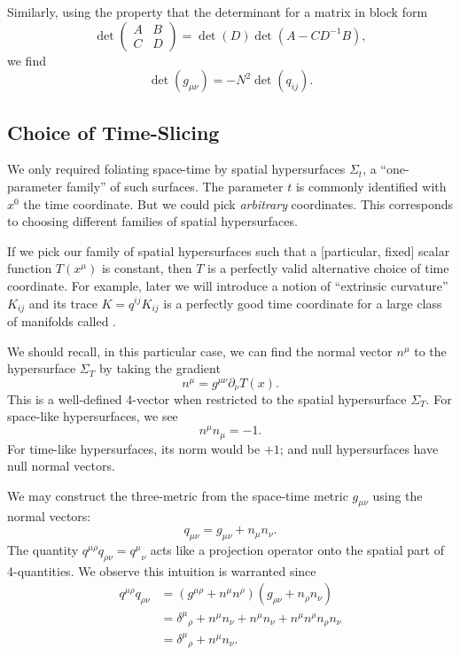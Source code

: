 Similarly, using the property that the determinant for a matrix in block
form
\begin{equation}
\det\begin{pmatrix}A & B\\ C & D
\end{pmatrix} = \det(D)\det(A - CD^{-1}B),
\end{equation}
we find
\begin{equation}\label{eq:cauchy-surface:determinant-of-metric}
\det(g_{\mu\nu}) = -N^{2}\det(q_{ij}).
\end{equation}

\subsection{Choice of Time-Slicing}

We only required foliating space-time by spatial hypersurfaces
$\Sigma_{t}$, a ``one-parameter family'' of such surfaces. The parameter
$t$ is commonly identified with $x^{0}$ the time coordinate. But we
could pick \emph{arbitrary} coordinates. This corresponds to choosing
different families of spatial hypersurfaces.

If we pick our family of spatial hypersurfaces such that a [particular,
fixed] scalar function $T(x^{\mu})$ is constant, then $T$ is a perfectly
valid alternative choice of time coordinate. For example, later we will
introduce a notion of ``extrinsic curvature'' $K_{ij}$ and its trace
$K=q^{ij}K_{ij}$ is a perfectly good time coordinate for a large class
of manifolds called .

We should recall, in this particular case, we can find the normal vector
$n^{\mu}$ to the hypersurface $\Sigma_{T}$ by taking the gradient
\begin{equation}
n^{\mu} = g^{\mu\nu}\partial_{\nu}T(x).
\end{equation}
This is a well-defined 4-vector when restricted to the spatial
hypersurface $\Sigma_{T}$. For space-like hypersurfaces, we see
\begin{equation}
n^{\mu}n_{\mu} = -1.
\end{equation}
For time-like hypersurfaces, its norm would be $+1$; and null
hypersurfaces have null normal vectors.

We may construct the three-metric from the space-time metric
$g_{\mu\nu}$ using the normal vectors:
\begin{equation}
q_{\mu\nu} = g_{\mu\nu} + n_{\mu}n_{\nu}.
\end{equation}
The quantity $q^{\mu\rho}q_{\rho\nu} = {q^{\mu}}_{\nu}$ acts like a
projection operator onto the spatial part of 4-quantities. We observe
this intuition is warranted since
\begin{subequations}
\begin{align}
q^{\mu\rho}q_{\rho\nu}
&= (g^{\mu\rho} + n^{\mu}n^{\rho})(g_{\rho\nu} + n_{\rho}n_{\nu})\\
&= {\delta^{\mu}}_{\rho} + n^{\mu}n_{\nu} + n^{\mu}n_{\nu} + n^{\mu}n^{\rho}n_{\rho}n_{\nu}\\
&= {\delta^{\mu}}_{\rho} + n^{\mu}n_{\nu}.
\end{align}
\end{subequations}

